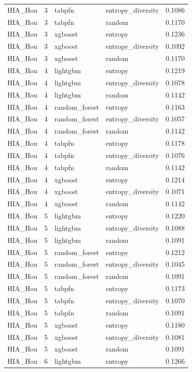 \begin{tabular}{lrllr}
HIA_Hou & 3 & tabpfn & entropy_diversity & 0.1086 \\
HIA_Hou & 3 & tabpfn & random & 0.1170 \\
HIA_Hou & 3 & xgboost & entropy & 0.1236 \\
HIA_Hou & 3 & xgboost & entropy_diversity & 0.1092 \\
HIA_Hou & 3 & xgboost & random & 0.1170 \\
HIA_Hou & 4 & lightgbm & entropy & 0.1219 \\
HIA_Hou & 4 & lightgbm & entropy_diversity & 0.1078 \\
HIA_Hou & 4 & lightgbm & random & 0.1142 \\
HIA_Hou & 4 & random_forest & entropy & 0.1163 \\
HIA_Hou & 4 & random_forest & entropy_diversity & 0.1057 \\
HIA_Hou & 4 & random_forest & random & 0.1142 \\
HIA_Hou & 4 & tabpfn & entropy & 0.1178 \\
HIA_Hou & 4 & tabpfn & entropy_diversity & 0.1076 \\
HIA_Hou & 4 & tabpfn & random & 0.1142 \\
HIA_Hou & 4 & xgboost & entropy & 0.1214 \\
HIA_Hou & 4 & xgboost & entropy_diversity & 0.1071 \\
HIA_Hou & 4 & xgboost & random & 0.1142 \\
HIA_Hou & 5 & lightgbm & entropy & 0.1220 \\
HIA_Hou & 5 & lightgbm & entropy_diversity & 0.1088 \\
HIA_Hou & 5 & lightgbm & random & 0.1091 \\
HIA_Hou & 5 & random_forest & entropy & 0.1212 \\
HIA_Hou & 5 & random_forest & entropy_diversity & 0.1045 \\
HIA_Hou & 5 & random_forest & random & 0.1091 \\
HIA_Hou & 5 & tabpfn & entropy & 0.1173 \\
HIA_Hou & 5 & tabpfn & entropy_diversity & 0.1070 \\
HIA_Hou & 5 & tabpfn & random & 0.1091 \\
HIA_Hou & 5 & xgboost & entropy & 0.1180 \\
HIA_Hou & 5 & xgboost & entropy_diversity & 0.1081 \\
HIA_Hou & 5 & xgboost & random & 0.1091 \\
HIA_Hou & 6 & lightgbm & entropy & 0.1266 \\

\end{tabular}
